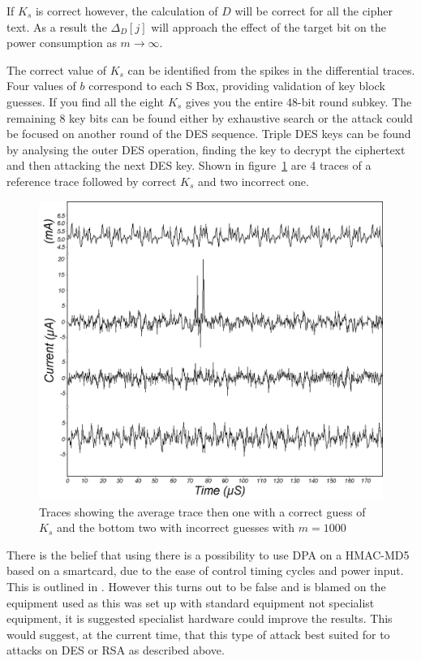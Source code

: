 \documentclass[a4paper,12pt]{article}
\begin{document}
If $K_s$ is correct however, the calculation of $D$ will be correct for all the cipher text. As a result the $\Delta_D[j]$ will approach the effect of the target bit on the power consumption as $m \rightarrow \infty$.

The correct value of $K_s$ can be identified from the spikes in the differential traces. Four values of $b$ correspond to each S Box, providing validation of key block guesses. If you find all the eight $K_s$ gives you the entire 48-bit round subkey. The remaining 8 key bits can be found either by exhaustive search or the attack could be focused on another round of the DES sequence. Triple DES keys can be found by analysing the outer DES operation, finding the key to decrypt the ciphertext and then attacking the next DES key. Shown in figure~\ref{fig:desResult} are 4 traces of a reference trace followed by correct $K_s$ and two incorrect one.

\begin{figure}
    \includegraphics[width=\textwidth]{DPATraces.png}
    \caption{Traces showing the average trace then one with a correct guess of $K_s$ and the bottom two with incorrect guesses with $m = 1000$}
    \label{fig:desResult}
\end{figure}


There is the belief that using there is a possibility to use DPA on a HMAC-MD5 based on a smartcard, due to the ease of control timing cycles and power input. This is outlined in \cite{JiriKur}. However this turns out to be false and is blamed on the equipment used as this was set up with standard equipment not specialist equipment, it is suggested specialist hardware could improve the results. This would suggest, at the current time, that this type of attack best suited for to attacks on DES or RSA as described above.
\end{document}
